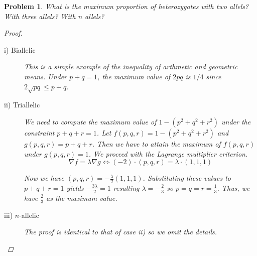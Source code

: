 \documentclass[12pt]{report}
\newtheorem{problem}{Problem}[chapter]
\begin{document}
        \begin{problem}
            What is the maximum proportion of heterozygotes with two allels? With three allels? With $n$ allels?
            \begin{proof}
                
                \begin{description}
                    \item[i) Biallelic]
                This is a simple example of the inequality of arthmetic and geometric means.
                Under $p+q=1$, the maximum value of $2pq$ is $1/4$ since $2 \sqrt{pq} \leq p+q$.

                    \item[ii) Triallelic]
                We need to compute the maximum value of $1-(p^2+q^2+r^2)$ under the constraint $p+q+r=1$. 
                Let $f(p,q,r) = 1-(p^2+q^2+r^2)$ and $g(p,q,r)=p+q+r$.
                Then we have to attain the maximum of $f(p,q,r)$ under $g(p,q,r)=1$.
                We proceed with the Lagrange multiplier criterion. 
                \begin{equation*}
                    \nabla{f} = \lambda \nabla{g} \Leftrightarrow
                    (-2) \cdot (p,q,r) = \lambda \cdot (1,1,1)
                \end{equation*}

                Now we have $(p,q,r) = -\frac{\lambda}{2}(1,1,1)$.
                Substituting these values to $p+q+r=1$ yields $-\frac{3\lambda}{2} = 1 $ resulting $\lambda = -\frac{2}{3}$ so $p=q=r=\frac{1}{3}$.
                Thus, we have $\frac{2}{3}$ as the maximum value.

                    \item[iii) $n$-allelic]
                        The proof is identical to that of case ii) so we omit the details.
                \end{description}
            \end{proof}

        \end{problem}
\end{document}
